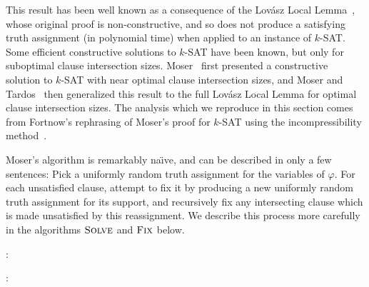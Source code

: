 \documentclass[prodmode,acmcsur]{acmsmall}
\begin{document}
This result has been well known as a consequence of the Lov\'{a}sz
Local Lemma~\cite{lovasz:locallemma}, whose original proof is
non-constructive, and so does not produce a satisfying truth
assignment (in polynomial time) when applied to an instance of
$k$-SAT. Some efficient constructive solutions to $k$-SAT have been
known, but only for suboptimal clause intersection sizes.
Moser~\cite{moser:ksat} first presented a constructive solution to
$k$-SAT with near optimal clause intersection sizes, and Moser and
Tardos~\cite{moser:locallemma} then generalized this result to the
full Lov\'{a}sz Local Lemma for optimal clause intersection sizes. The
analysis which we reproduce in this section comes from Fortnow's
rephrasing of Moser's proof for $k$-SAT using the incompressibility
method~\cite{fortnow:ksat}.

Moser's algorithm is remarkably na\"\i ve, and can be described in only a
few sentences: Pick a uniformly random truth assignment for the
variables of $\varphi$. For each unsatisfied clause, attempt to fix it
by producing a new uniformly random truth assignment for its support,
and recursively fix any intersecting clause which is made unsatisfied
by this reassignment. We describe this process more carefully in the
algorithms $\textsc{Solve}$ and $\textsc{Fix}$ below.

:
\begin{algorithmic}[1]
  \ENDWHILE
  \RETURN{$\alpha$}
\end{algorithmic}

:
\begin{algorithmic}[1]
  \ENDWHILE
  \RETURN{$\alpha$}
\end{algorithmic}
\end{document}
